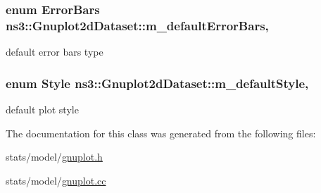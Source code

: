 \subsubsection[{\texorpdfstring{m\+\_\+default\+Error\+Bars}{m_defaultErrorBars}}]{\setlength{\rightskip}{0pt plus 5cm}enum {\bf Error\+Bars} ns3\+::\+Gnuplot2d\+Dataset\+::m\+\_\+default\+Error\+Bars\hspace{0.3cm}{\ttfamily [static]}, {\ttfamily [private]}}\hypertarget{classns3_1_1Gnuplot2dDataset_aea3f3688ff281aeba6860a62416f4e83}{}\label{classns3_1_1Gnuplot2dDataset_aea3f3688ff281aeba6860a62416f4e83}


default error bars type 

\subsubsection[{\texorpdfstring{m\+\_\+default\+Style}{m_defaultStyle}}]{\setlength{\rightskip}{0pt plus 5cm}enum {\bf Style} ns3\+::\+Gnuplot2d\+Dataset\+::m\+\_\+default\+Style\hspace{0.3cm}{\ttfamily [static]}, {\ttfamily [private]}}\hypertarget{classns3_1_1Gnuplot2dDataset_a5c4951f790ca41a3b0ed6807997456fc}{}\label{classns3_1_1Gnuplot2dDataset_a5c4951f790ca41a3b0ed6807997456fc}


default plot style 



The documentation for this class was generated from the following files\+:\begin{DoxyCompactItemize}
\item 
stats/model/\hyperlink{gnuplot_8h}{gnuplot.\+h}\item 
stats/model/\hyperlink{gnuplot_8cc}{gnuplot.\+cc}\end{DoxyCompactItemize}
